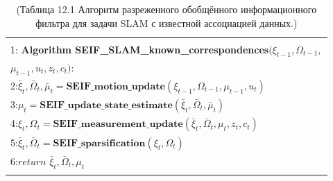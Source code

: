 \documentclass[10pt,a4paper]{article}
\begin{document}
\begin{table}[H]
\begin{center}
\begin{tabular}{|l|}
\hline
{}\\
1:\textbf{ Algorithm SEIF\_SLAM\_known\_correspondences}$(\xi_{t-1},\varOmega_{t-1},$\\
\hspace{95mm}$\mu_{t-1},u_t,z_t,c_t)$:\\
2:\hspace{5mm}$\bar{\xi}_t,\bar{\varOmega}_t,\bar{\mu}_t=\textbf{SEIF\_motion\_update}(\xi_{t-1},\varOmega_{t-1},\mu_{t-1},u_t)$\\
3:\hspace{5mm}$\mu_t=\textbf{SEIF\_update\_state\_estimate}(\bar{\xi}_t,\bar{\varOmega}_t,\bar{\mu}_t)$\\
4:\hspace{5mm}$\xi_t,\varOmega_t=\textbf{SEIF\_measurement\_update}(\bar{\xi}_t,\bar{\varOmega}_t,\mu_t,z_t,c_t)$\\
5:\hspace{5mm}$\bar{\xi}_t,\bar{\varOmega}_t=\textbf{SEIF\_sparsification}(\xi_t,\varOmega_t)$\\
6:\hspace{5mm}$\textit{return}\,\,\bar{\xi}_t,\bar{\varOmega}_t,\mu_t$\\
{}\\
\hline
\end{tabular}
\caption{(Таблица 12.1 Алгоритм разреженного обобщённого информационного фильтра для задачи SLAM с известной ассоциацией данных.)}
\end{center}
\end{table}
\end{document}

